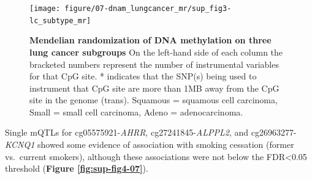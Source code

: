 \documentclass[11pt,twoside]{bristolthesis}
\begin{document}
\begin{figure}

{\centering \texttt{[image: figure/07-dnam\_lungcancer\_mr/sup\_fig3-lc\_subtype\_mr]} 

}

\caption[Mendelian randomization of DNA methylation on three lung cancer subgroups]{\textbf{Mendelian randomization of DNA methylation on three lung cancer subgroups} On the left-hand side of each column the bracketed numbers represent the number of instrumental variables for that CpG site. * indicates that the SNP(s) being used to instrument that CpG site are more than 1MB away from the CpG site in the genome (trans). Squamous = squamous cell carcinoma, Small = small cell carcinoma, Adeno = adenocarcinoma.}\label{fig:sup-fig3-07}
\end{figure}
Single mQTLs for cg05575921-\emph{AHRR}, cg27241845-\emph{ALPPL2}, and cg26963277-\emph{KCNQ1} showed some evidence of association with smoking cessation (former vs.~current smokers), although these associations were not below the FDR\textless0.05 threshold (\textbf{Figure \ref{fig:sup-fig4-07}}). \pagebreak
\end{document}

